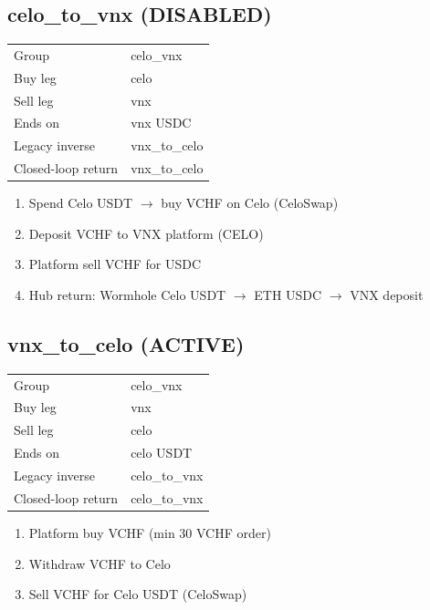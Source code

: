 \documentclass[11pt,a4paper]{article}
\begin{document}
\subsection*{\textcolor{warnred}{celo\_to\_vnx} (DISABLED)}
\begin{tabular}{@{}ll@{}}
Group & celo\_vnx \\
Buy leg & celo \\
Sell leg & vnx \\
Ends on & vnx USDC \\
Legacy inverse & vnx\_to\_celo \\
Closed-loop return & vnx\_to\_celo \\
\end{tabular}
\begin{enumerate}[nosep,leftmargin=*]
\item Spend Celo USDT $\rightarrow$ buy VCHF on Celo (CeloSwap)
\item Deposit VCHF to VNX platform (CELO)
\item Platform sell VCHF for USDC
\item Hub return: Wormhole Celo USDT $\rightarrow$ ETH USDC $\rightarrow$ VNX deposit
\end{enumerate}
\subsection*{\textcolor{okgreen}{vnx\_to\_celo} (ACTIVE)}
\begin{tabular}{@{}ll@{}}
Group & celo\_vnx \\
Buy leg & vnx \\
Sell leg & celo \\
Ends on & celo USDT \\
Legacy inverse & celo\_to\_vnx \\
Closed-loop return & celo\_to\_vnx \\
\end{tabular}
\begin{enumerate}[nosep,leftmargin=*]
\item Platform buy VCHF (min 30 VCHF order)
\item Withdraw VCHF to Celo
\item Sell VCHF for Celo USDT (CeloSwap)
\end{enumerate}
\end{document}
